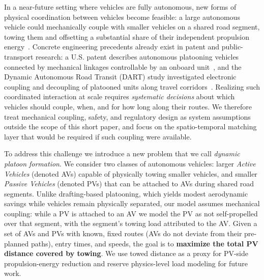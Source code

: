 \documentclass[sigconf]{acmart}
\begin{document}
In a near-future setting where vehicles are fully autonomous, new forms of physical coordination between vehicles become feasible: a large autonomous vehicle could mechanically couple with smaller vehicles on a shared road segment, towing them and offsetting a substantial share of their independent propulsion energy~\cite{yurtsever2020survey,shladover2009cooperative}. Concrete engineering precedents already exist in patent and public-transport research: a U.S. patent describes autonomous platooning vehicles connected by mechanical linkages controllable by an onboard unit~\cite{uspto12518633}, and the Dynamic Autonomous Road Transit (DART) study investigated electronic coupling and decoupling of platooned units along travel corridors~\cite{nguyen2019platooning}. Realizing such coordinated interaction at scale requires \emph{systematic decisions} about which vehicles should couple, when, and for how long along their routes. We therefore treat mechanical coupling, safety, and regulatory design as system assumptions outside the scope of this short paper, and focus on the spatio-temporal matching layer that would be required if such coupling were available.

To address this challenge we introduce a new problem that we call \textit{dynamic platoon formation}. We consider two classes of autonomous vehicles: larger \textit{Active Vehicles} (denoted AVs) capable of physically towing smaller vehicles, and smaller \textit{Passive Vehicles} (denoted PVs) that can be attached to AVs during shared road segments. Unlike drafting-based platooning, which yields modest aerodynamic savings while vehicles remain physically separated, our model assumes mechanical coupling: while a PV is attached to an AV we model the PV as not self-propelled over that segment, with the segment's towing load attributed to the AV. Given a set of AVs and PVs with known, fixed routes (AVs do not deviate from their pre-planned paths), entry times, and speeds, the goal is to \textbf{maximize the total PV distance covered by towing}. We use towed distance as a proxy for PV-side propulsion-energy reduction and reserve physics-level load modeling for future work.
\end{document}
